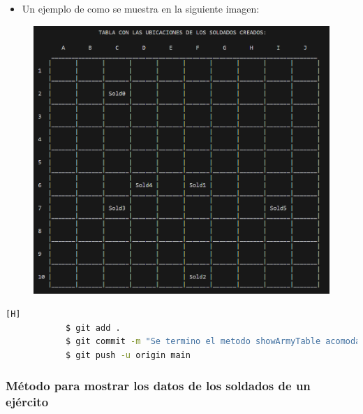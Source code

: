 \documentclass{article}
\begin{document}
        

        \newpage
        \begin{itemize}
            \begin{itemize}
                \item Un ejemplo de como se muestra en la siguiente imagen:
            \end{itemize}
        \end{itemize}

        \begin{figure}[H]
            \centering
            \includegraphics[width=1.0\textwidth,keepaspectratio]{img/showArmyTable.png}
            \caption{}
        \end{figure}

        \begin{lstlisting}[language=bash,caption={Commit: }][H]
    		$ git add .
    		$ git commit -m "Se termino el metodo showArmyTable acomodando los indice de letras y numero"			
    		$ git push -u origin main
    	\end{lstlisting}
        
        \newpage
        \subsubsection{Método para mostrar los datos de los soldados de un ejército}
\end{document}
